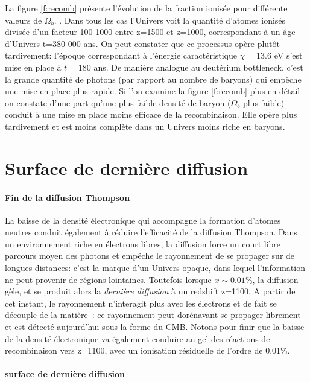 La figure \ref{f:recomb} présente l'évolution de la fraction ionisée pour différente valeurs de $\Omega_b$. . Dans tous les cas l'Univers voit la quantité d'atomes ionisés divisée d'un facteur 100-1000 entre z=1500 et z=1000, correspondant à un âge d'Univers t=380 000 ans. On peut constater que ce processus opère plutôt tardivement: l'époque correspondant à l'énergie caractéristique $\chi=$13.6 eV s'est mise en place à $t=180$ ans. De manière analogue au deutérium bottleneck, c'est la grande quantité de photons (par rapport au nombre de baryons) qui empêche une mise en place plus rapide. Si l'on examine la figure \ref{f:recomb} plus en détail on constate d'une part qu'une plus faible densité de baryon ($\Omega_b$ plus faible) conduit à une mise en place moins efficace de la recombinaison. Elle opère plus tardivement et est moins complète dans un Univers moins riche en baryons.

\section{Surface de dernière diffusion}

\paragraph{Fin de la diffusion Thompson} La baisse de la densité électronique qui accompagne la formation d'atomes neutres conduit également à réduire l'efficacité de la diffusion Thompson. Dans un environnement riche en électrons libres, la diffusion force un court libre parcours moyen des photons et empêche le rayonnement de se propager sur de longues distances: c'est la marque d'un Univers opaque, dans lequel l'information ne peut provenir de régions lointaines.  Toutefois lorsque $x\sim 0.01\%$, la diffusion gèle, et se produit alors la \textit{dernière diffusion} à un redshift z=1100. A partir de cet instant, le rayonnement n'interagit plus avec les électrons et de fait se découple de la matière~: ce rayonnement peut dorénavant se propager librement et est détecté aujourd'hui sous la forme du CMB. Notons pour finir que la baisse de la densité électronique va également conduire au gel des réactions de recombinaison vers z=1100, avec un ionisation résiduelle de l'ordre de 0.01\%.



\paragraph{surface de dernière diffusion}

